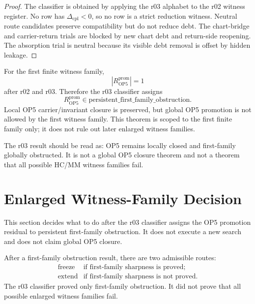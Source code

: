 \begin{proof}
The classifier is obtained by applying the r03 alphabet to the r02 witness
register.  No row has \(\Delta_{\mathrm{cpl}}<0\), so no row is a strict
reduction witness.  Neutral route candidates preserve compatibility but do not
reduce debt.  The chart-bridge and carrier-return trials are blocked by new
chart debt and return-side reopening.  The absorption trial is neutral because
its visible debt removal is offset by hidden leakage.
\end{proof}

\begin{theorem}
For the first finite witness family,
\[
    |R_{\mathrm{OP5}}^{\mathrm{prom}}| = 1
\]
after r02 and r03.  Therefore the r03 classifier assigns
\[
    R_{\mathrm{OP5}}^{\mathrm{prom}}
    \in
    \mathrm{persistent\_first\_family\_obstruction}.
\]
Local OP5 carrier/invariant closure is preserved, but global OP5 promotion is
not allowed by the first witness family.  This theorem is scoped to the first
finite family only; it does not rule out later enlarged witness families.
\end{theorem}

\begin{remark}
The r03 result should be read as: OP5 remains locally closed and first-family
globally obstructed.  It is not a global OP5 closure theorem and not a theorem
that all possible HC/MM witness families fail.
\end{remark}



\section{Enlarged Witness-Family Decision}
\label{sec:v450-r04-enlarged-witness-family-decision}

This section decides what to do after the r03 classifier assigns the OP5
promotion residual to persistent first-family obstruction.  It does not execute
a new search and does not claim global OP5 closure.

\begin{definition}
After a first-family obstruction result, there are two admissible routes:
\[
\begin{array}{ll}
\mathrm{freeze} & \text{if first-family sharpness is proved;}\\
\mathrm{extend} & \text{if first-family sharpness is not proved.}
\end{array}
\]
The r03 classifier proved only first-family obstruction.  It did not prove
that all possible enlarged witness families fail.
\end{definition}

